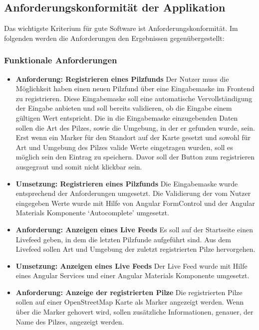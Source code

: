 \documentclass[../main.tex]{subfiles}
\begin{document}
\subsection{Anforderungskonformität der Applikation}

Das wichtigste Kriterium für gute Software ist Anforderungskonformität. Im folgenden werden die Anforderungen den Ergebnissen gegenübergestellt:

\subsubsection{Funktionale Anforderungen}

\begin{itemize}

	\item \textbf{Anforderung: Registrieren eines Pilzfunds}
	      Der Nutzer muss die Möglichkeit haben einen neuen Pilzfund über eine Eingabemaske im Frontend zu registrieren. Diese Eingabemaske soll eine
	      automatische Vervollständigung der Eingabe anbieten und soll bereits validieren, ob die Eingabe einem gültigen Wert entspricht. Die in die
	      Eingabemaske einzugebenden Daten sollen die Art des Pilzes, sowie die Umgebung, in der er gefunden wurde, sein. Erst wenn ein Marker für den
	      Standort auf der Karte gesetzt und sowohl für Art und Umgebung des Pilzes valide Werte eingetragen wurden, soll es möglich sein den Eintrag zu
	      speichern. Davor soll der Button zum registrieren ausgegraut und somit nicht klickbar sein.

	\item \textbf{Umsetzung: Registrieren eines Pilzfunds}
	      Die Eingabemaske wurde entsprechend der Anforderungen umgesetzt. Die Validierung der vom Nutzer eingegeben Werte wurde mit Hilfe von Angular
	      FormControl und der Angular Materials Komponente `Autocomplete' umgesetzt.

	\item \textbf{Anforderung: Anzeigen eines Live Feeds}
	      Es soll auf der Startseite einen Livefeed geben, in dem die letzten Pilzfunde aufgeführt sind. Aus dem Livefeed sollen Art und Umgebung der
	      zuletzt registrierten Pilze hervorgehen.

	\item \textbf{Umsetzung: Anzeigen eines Live Feeds}
	      Der Live Feed wurde mit Hilfe eines Angular Services und einer Angular Materials Komponente umgesetzt.

	\item \textbf{Anforderung: Anzeige der registrierten Pilze}
	      Die registrierten Pilze sollen auf einer OpenStreetMap Karte als Marker angezeigt werden. Wenn über die Marker gehovert wird, sollen zusätzliche
	      Informationen, genauer, der Name des Pilzes, angezeigt werden.


\end{itemize}
\end{document}

